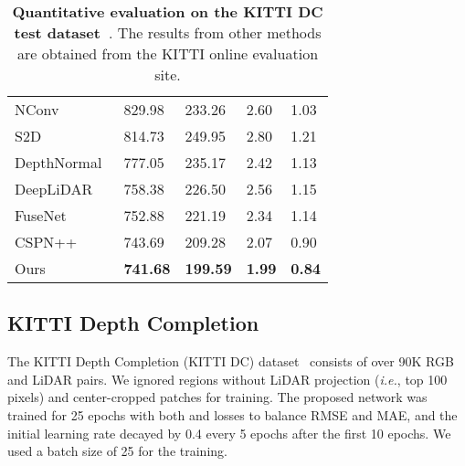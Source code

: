 \documentclass[runningheads]{llncs}
\newcommand{\ie}{\textit{i.e.}}
\begin{document}
\begin{table}[t]
{\begin{minipage}[t]{0.45\linewidth}
\begin{center}
\begin{tabular}{C{19mm}|C{8mm}C{8mm}C{7mm}C{7mm}}
NConv~\cite{eldesokey2019confidence} & 829.98 & 233.26 & 2.60 & 1.03 \\ 
S2D~\cite{ma2018sparse} & 814.73 & 249.95 & 2.80 & 1.21 \\ 
DepthNormal~\cite{xu2019depth} & 777.05 & 235.17 & 2.42 & 1.13 \\ 
DeepLiDAR~\cite{qiu2019deeplidar} & 758.38 & 226.50 & 2.56 & 1.15 \\ 
FuseNet~\cite{chen2019learning} & 752.88 & 221.19 & 2.34 & 1.14 \\ 
CSPN++~\cite{cheng2019cspnpp} & 743.69 & 209.28 & 2.07 & 0.90 \\ 
Ours & \textbf{741.68} & \textbf{199.59} & \textbf{1.99} & \textbf{0.84} \\ \hline
        \end{tabular}
\caption{\textbf{Quantitative evaluation on the KITTI DC test dataset~\cite{uhrig2017sparsity}}.
        The results from other methods are obtained from the KITTI online evaluation site.}
        \label{tab:quan_kitti}
        \end{center}
    \end{minipage}
}
\end{table}


\subsection{KITTI Depth Completion}
\label{subsec:kitti_dc}
The KITTI Depth Completion (KITTI DC) dataset~\cite{uhrig2017sparsity} consists of over 90K RGB and LiDAR pairs. 
We ignored regions without LiDAR projection (\ie, top 100 pixels) and center-cropped  patches for training. 
The proposed network was trained for 25 epochs with both  and  losses to balance RMSE and MAE, and the initial learning rate decayed by 0.4 every 5 epochs after the first 10 epochs. 
We used a batch size of 25 for the training.
\end{document}
